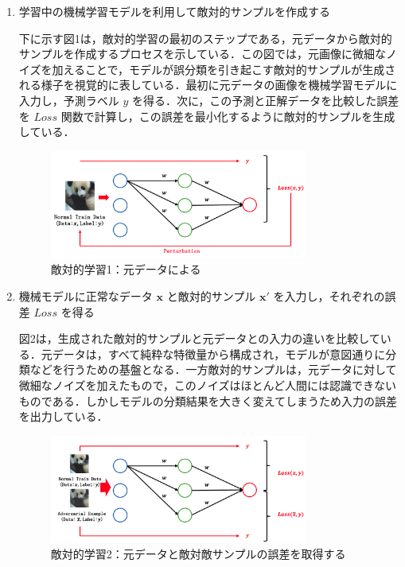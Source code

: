 \begin{enumerate}

    \item 学習中の機械学習モデルを利用して敵対的サンプルを作成する

    下に示す図1は，敵対的学習の最初のステップである，元データから敵対的サンプルを作成するプロセスを示している．この図では，元画像に微細なノイズを加えることで，モデルが誤分類を引き起こす敵対的サンプルが生成される様子を視覚的に表している．最初に元データの画像を機械学習モデルに入力し，予測ラベル $y$ を得る．次に，この予測と正解データを比較した誤差を $Loss$ 関数で計算し，この誤差を最小化するように敵対的サンプルを生成している．
    
    \begin{figure}[H]
        \centering
        \includegraphics[width=0.8\textwidth]{images/敵対的学習1.png}
        \caption{敵対的学習1：元データによる}
        \label{fig:adversarial_learning1}
    \end{figure}
    
    \item 機械モデルに正常なデータ $\bm{x}$ と敵対的サンプル $\bm{x}'$ を入力し，それぞれの誤差 $Loss$ を得る

    図2は，生成された敵対的サンプルと元データとの入力の違いを比較している．元データは，すべて純粋な特徴量から構成され，モデルが意図通りに分類などを行うための基盤となる．一方敵対的サンプルは，元データに対して微細なノイズを加えたもので，このノイズはほとんど人間には認識できないものである．しかしモデルの分類結果を大きく変えてしまうため入力の誤差を出力している．

    \begin{figure}[H]
        \centering
        \includegraphics[width=0.8\textwidth]{images/敵対的学習2.png}
        \caption{敵対的学習2：元データと敵対敵サンプルの誤差を取得する}
        \label{fig:adversarial_learning2}
    \end{figure}


\end{enumerate}
